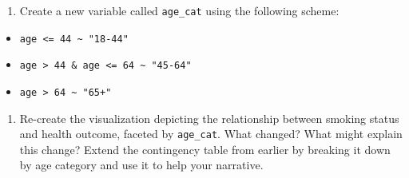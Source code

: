 \documentclass[
]{article}
\newenvironment{Shaded}{\begin{snugshade}}{\end{snugshade}}
\newcommand{\AttributeTok}[1]{\textcolor[rgb]{0.13,0.29,0.53}{#1}}
\newcommand{\DecValTok}[1]{\textcolor[rgb]{0.00,0.00,0.81}{#1}}
\newcommand{\FunctionTok}[1]{\textcolor[rgb]{0.13,0.29,0.53}{\textbf{#1}}}
\newcommand{\NormalTok}[1]{#1}
\newcommand{\OtherTok}[1]{\textcolor[rgb]{0.56,0.35,0.01}{#1}}
\newcommand{\SpecialCharTok}[1]{\textcolor[rgb]{0.81,0.36,0.00}{\textbf{#1}}}
\newcommand{\StringTok}[1]{\textcolor[rgb]{0.31,0.60,0.02}{#1}}
\providecommand{\tightlist}{%
  \setlength{\itemsep}{0pt}\setlength{\parskip}{0pt}}
\begin{document}
\begin{enumerate}
\def\labelenumi{\arabic{enumi}.}
\setcounter{enumi}{5}
\tightlist
\item
  Create a new variable called \texttt{age\_cat} using the following
  scheme:
\end{enumerate}

\begin{itemize}
\tightlist
\item
  \texttt{age\ \textless{}=\ 44\ \textasciitilde{}\ "18-44"}
\item
  \texttt{age\ \textgreater{}\ 44\ \&\ age\ \textless{}=\ 64\ \textasciitilde{}\ "45-64"}
\item
  \texttt{age\ \textgreater{}\ 64\ \textasciitilde{}\ "65+"}
\end{itemize}

\begin{Shaded}
\end{Shaded}

\begin{enumerate}
\def\labelenumi{\arabic{enumi}.}
\setcounter{enumi}{6}
\tightlist
\item
  Re-create the visualization depicting the relationship between smoking
  status and health outcome, faceted by \texttt{age\_cat}. What changed?
  What might explain this change? Extend the contingency table from
  earlier by breaking it down by age category and use it to help your
  narrative.
\end{enumerate}
\end{document}
